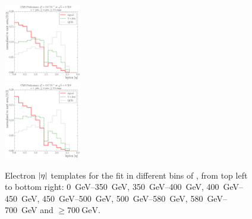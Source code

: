 \begin{figure}[!htbp]
    {\includegraphics[width=0.3\textwidth]{measurement/ST/central/fit_templates/electron_templates_bin_580-700}}\\
    {\includegraphics[width=0.3\textwidth]{measurement/ST/central/fit_templates/electron_templates_bin_700-inf}}
    \caption{Electron $\lvert \eta \rvert$ templates for the fit in different bins of \ST,
    from top left to bottom right: \SIrange{0}{350}{\GeV}, \SIrange{350}{400}{\GeV},
    \SIrange{400}{450}{\GeV}, \SIrange{450}{500}{\GeV}, \SIrange{500}{580}{\GeV},
    \SIrange{580}{700}{\GeV} and $\geq \SI{700}{\GeV}$.}
    \label{fig:fit_tempaltes_ST_electron}
\end{figure}

